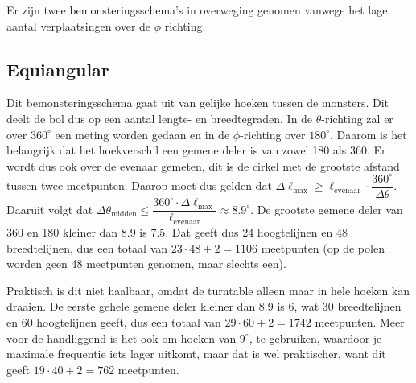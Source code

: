 
Er zijn twee bemonsteringsschema's in overweging genomen vanwege het lage aantal verplaatsingen over de $\phi$ richting.
\subsection{Equiangular}
Dit bemonsteringsschema gaat uit van gelijke hoeken tussen de monsters.
Dit deelt de bol dus op een aantal lengte- en breedtegraden. In de $\theta$-richting zal er over $360^\circ$ een meting worden gedaan en in de $\phi$-richting over $180^\circ$. Daarom is het belangrijk dat het hoekverschil een gemene deler is van zowel 180 als 360. Er wordt dus ook over de evenaar gemeten, dit is de cirkel met de grootste afstand tussen twee meetpunten. Daarop moet dus gelden dat $\Delta\ell_\text{max}\geq\ell_\text{evenaar}\cdot\dfrac{360^\circ}{\Delta\theta}$. Daaruit volgt dat $\Delta\theta_\text{midden}\leq\dfrac{360^\circ\cdot\Delta\ell_\text{max}}{\ell_\text{evenaar}}\approx8.9^\circ$. De grootste gemene deler van 360 en 180 kleiner dan 8.9 is 7.5. Dat geeft dus 24 hoogtelijnen en 48 breedtelijnen, dus een totaal van $23\cdot 48+2=1106$ meetpunten (op de polen worden geen 48 meetpunten genomen, maar slechts een).

Praktisch is dit niet haalbaar, omdat de turntable alleen maar in hele hoeken kan draaien. De eerste gehele gemene deler kleiner dan 8.9 is 6, wat 30 breedtelijnen en 60 hoogtelijnen geeft, dus een totaal van $29\cdot60+2=1742$ meetpunten. Meer voor de handliggend is het ook om hoeken van $9^\circ$, te gebruiken, waardoor je maximale frequentie iets lager uitkomt, maar dat is wel praktischer, want dit geeft $19\cdot 40+2=762$ meetpunten.
